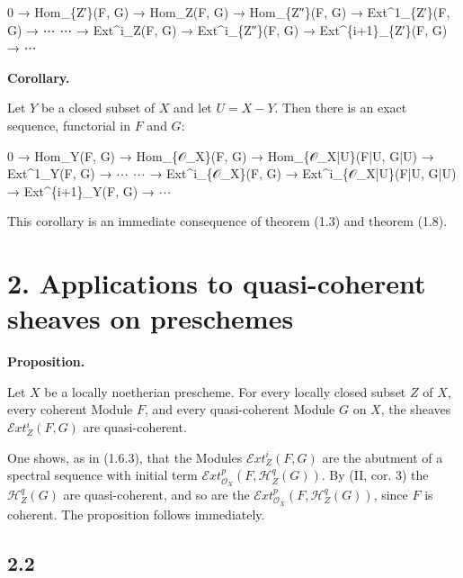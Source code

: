 \documentclass[
  11pt,
  a4paper,
]{book}
\newenvironment{Shaded}{}{}
\newcommand{\NormalTok}[1]{#1}
\begin{document}
\begin{Shaded}
\begin{Highlighting}[]
\NormalTok{0 → Hom\_\{Z′\}(F, G) → Hom\_Z(F, G) → Hom\_\{Z″\}(F, G) → Ext\^{}1\_\{Z′\}(F, G) → ⋯}
\NormalTok{    ⋯ → Ext\^{}i\_Z(F, G) → Ext\^{}i\_\{Z″\}(F, G) → Ext\^{}\{i+1\}\_\{Z′\}(F, G) → ⋯}
\end{Highlighting}
\end{Shaded}

\textbf{Corollary.}

Let \(Y\) be a closed subset of \(X\) and let \(U = X - Y\). Then there
is an exact sequence, functorial in \(F\) and \(G\):

\begin{Shaded}
\begin{Highlighting}[]
\NormalTok{0 → Hom\_Y(F, G) → Hom\_\{𝒪\_X\}(F, G) → Hom\_\{𝒪\_X|U\}(F|U, G|U) → Ext\^{}1\_Y(F, G) → ⋯}
\NormalTok{    ⋯ → Ext\^{}i\_\{𝒪\_X\}(F, G) → Ext\^{}i\_\{𝒪\_X|U\}(F|U, G|U) → Ext\^{}\{i+1\}\_Y(F, G) → ⋯}
\end{Highlighting}
\end{Shaded}

This corollary is an immediate consequence of theorem (1.3) and theorem
(1.8).

\section{2. Applications to quasi-coherent sheaves on
preschemes}\label{applications-to-quasi-coherent-sheaves-on-preschemes}

\textbf{Proposition.}

Let \(X\) be a locally noetherian prescheme. For every locally closed
subset \(Z\) of \(X\), every coherent Module \(F\), and every
quasi-coherent Module \(G\) on \(X\), the sheaves
\(\mathcal{E}xt^{i}_{Z}(F, G)\) are quasi-coherent.

One shows, as in (1.6.3), that the Modules
\(\mathcal{E}xt^{i}_{Z}(F, G)\) are the abutment of a spectral sequence
with initial term
\(\mathcal{E}xt^{p}_{\mathcal{O}_{X}}(F, \mathcal{H}^{q}_{Z}(G))\). By
(II, cor. 3) the \(\mathcal{H}^{q}_{Z}(G)\) are quasi-coherent, and so
are the \(\mathcal{E}xt^{p}_{\mathcal{O}_{X}}(F,
\mathcal{H}^{q}_{Z}(G))\), since \(F\) is coherent. The proposition
follows immediately.

\subsection{2.2}\label{section-4}
\end{document}
